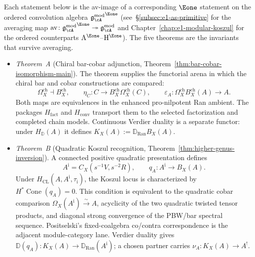 Each statement below is the av-image of a corresponding
$\Eone$ statement on the ordered convolution algebra
${\gAmod}^{\Eone}$
(see~\S\ref{subsec:e1-as-primitive} for the averaging map
$\operatorname{av}\colon{\gAmod}^{\Eone}\twoheadrightarrow\gAmod$
and Chapter~\ref{chap:e1-modular-koszul} for the ordered
counterparts $\mathrm{A}^{\Eone}$--$\mathrm{H}^{\Eone}$).
The five theorems are the invariants that survive averaging.

\begin{itemize}
 \item \emph{Theorem~A} (Chiral bar-cobar adjunction,
 Theorem~\ref{thm:bar-cobar-isomorphism-main}).
 The theorem supplies the functorial arena in which the chiral bar and
 cobar constructions are compared:
 \[
 \Omega^{\mathrm{ch}}_X \dashv B^{\mathrm{ch}}_X,\qquad
 \eta_C\colon C\to B^{\mathrm{ch}}_X\Omega^{\mathrm{ch}}_X(C),
 \qquad
 \varepsilon_A\colon
 \Omega^{\mathrm{ch}}_X B^{\mathrm{ch}}_X(A)\to A .
 \]
 Both maps are equivalences in the enhanced pro-nilpotent Ran
 ambient.  The packages $H_{\mathrm{fact}}$ and
 $H_{\mathrm{conv}}$ transport them to the selected factorization and
 completed chain models.  Continuous Verdier duality is a separate
 functor: under $H_{\mathbb D}(A)$ it defines
 $K_X(A):=\mathbb D_{\operatorname{Ran}}B_X(A)$.

\item \emph{Theorem~B} (Quadratic Koszul recognition,
 Theorem~\ref{thm:higher-genus-inversion}).
 A connected positive quadratic presentation defines
 \[
 A^{\mathrm i}=C_X(s^{-1}V,s^{-2}R),
 \qquad
 q_A\colon A^{\mathrm i}\longrightarrow B_X(A).
 \]
 Under $H_{\mathrm{CL}}(A,A^{\mathrm i},\tau_{\mathrm i})$, the
 Koszul locus is characterized by
 $H^*\operatorname{Cone}(q_A)=0$.  This condition is equivalent to
 the quadratic cobar comparison
 $\Omega_X(A^{\mathrm i})\xrightarrow{\sim}A$, acyclicity of the two
 quadratic twisted tensor products, and diagonal strong convergence
 of the PBW/bar spectral sequence.  Positselski's fixed-coalgebra
 co/contra correspondence is the adjacent module-category lane.
 Verdier duality gives
 $\mathbb D(q_A)\colon K_X(A)\to
 \mathbb D_{\operatorname{Ran}}(A^{\mathrm i})$; a chosen partner
 carries $\nu_A\colon K_X(A)\to A^!$.


\end{itemize}
